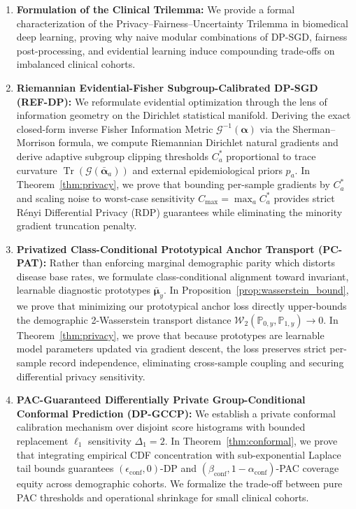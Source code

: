 \documentclass[pdflatex,sn-vancouver-num,referee,lineno]{sn-jnl}
\theoremstyle{thmstyleone}
\theoremstyle{thmstylethree}
\begin{document}
\begin{enumerate}
    \item \textbf{Formulation of the Clinical Trilemma:} We provide a formal characterization of the Privacy--Fairness--Uncertainty Trilemma in biomedical deep learning, proving why naive modular combinations of DP-SGD, fairness post-processing, and evidential learning induce compounding trade-offs on imbalanced clinical cohorts.
    \item \textbf{Riemannian Evidential-Fisher Subgroup-Calibrated DP-SGD (REF-DP):} We reformulate evidential optimization through the lens of information geometry on the Dirichlet statistical manifold. Deriving the exact closed-form inverse Fisher Information Metric $\mathcal{G}^{-1}(\boldsymbol{\alpha})$ via the Sherman--Morrison formula, we compute Riemannian Dirichlet natural gradients and derive adaptive subgroup clipping thresholds $C_a^*$ proportional to trace curvature $\operatorname{Tr}(\mathcal{G}(\bar{\boldsymbol{\alpha}}_a))$ and external epidemiological priors $p_a$. In Theorem~\ref{thm:privacy}, we prove that bounding per-sample gradients by $C_a^*$ and scaling noise to worst-case sensitivity $C_{\max} = \max_a C_a^*$ provides strict Rényi Differential Privacy (RDP) guarantees while eliminating the minority gradient truncation penalty.
    \item \textbf{Privatized Class-Conditional Prototypical Anchor Transport (PC-PAT):} Rather than enforcing marginal demographic parity which distorts disease base rates, we formulate class-conditional alignment toward invariant, learnable diagnostic prototypes $\bar{\boldsymbol{\mu}}_y$. In Proposition~\ref{prop:wasserstein_bound}, we prove that minimizing our prototypical anchor loss directly upper-bounds the demographic 2-Wasserstein transport distance $\mathcal{W}_2(\mathbb{P}_{0, y}, \mathbb{P}_{1, y}) \to 0$. In Theorem~\ref{thm:privacy}, we prove that because prototypes are learnable model parameters updated via gradient descent, the loss preserves strict per-sample record independence, eliminating cross-sample coupling and securing differential privacy sensitivity.
    \item \textbf{PAC-Guaranteed Differentially Private Group-Conditional Conformal Prediction (DP-GCCP):} We establish a private conformal calibration mechanism over disjoint score histograms with bounded replacement $\ell_1$ sensitivity $\Delta_1 = 2$. In Theorem~\ref{thm:conformal}, we prove that integrating empirical CDF concentration with sub-exponential Laplace tail bounds guarantees $(\epsilon_{\text{conf}}, 0)$-DP and $(\beta_{\text{conf}}, 1-\alpha_{\text{conf}})$-PAC coverage equity across demographic cohorts. We formalize the trade-off between pure PAC thresholds and operational shrinkage for small clinical cohorts.

\end{enumerate}
\end{document}
